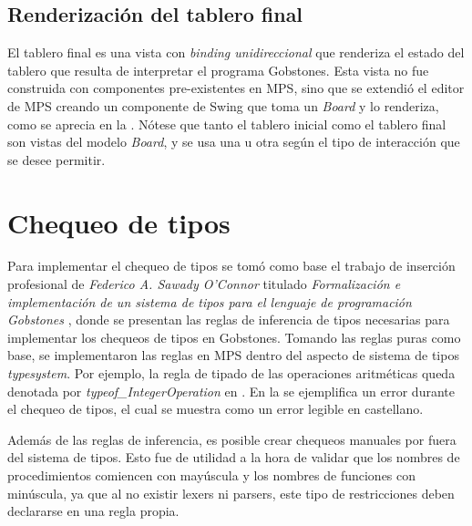 \subsection{Renderización del tablero final}

El tablero final es una vista con \textit{binding unidireccional} que renderiza el estado del tablero que resulta de interpretar el programa Gobstones. Esta vista no fue construida con componentes pre-existentes en MPS, sino que se extendió el editor de MPS creando un componente de Swing que toma un \textit{Board} y lo renderiza, como se aprecia en la . Nótese que tanto el tablero inicial como el tablero final son vistas del modelo \textit{Board}, y se usa una u otra según el tipo de interacción que se desee permitir.



\section{Chequeo de tipos}\label{chequeo}

Para implementar el chequeo de tipos se tomó como base el trabajo de inserción profesional de \textit{Federico A. Sawady O’Connor} titulado \textit{Formalización e implementación de un sistema de tipos para el lenguaje de programación Gobstones} \cite{TiposGobstones}, donde se presentan las reglas de inferencia de tipos necesarias para implementar los chequeos de tipos en Gobstones. 
Tomando las reglas puras como base, se implementaron las reglas en MPS dentro del aspecto de sistema de tipos \textit{typesystem}. Por ejemplo, la regla de tipado de las operaciones aritméticas queda denotada por \textit{typeof\_IntegerOperation} en .
En la  se ejemplifica un error durante el chequeo de tipos, el cual se muestra como un error legible en castellano.


Además de las reglas de inferencia, es posible crear chequeos manuales por fuera del sistema de tipos. Esto fue de utilidad a la hora de validar que los nombres de procedimientos comiencen con mayúscula y los nombres de funciones con minúscula, ya que al no existir lexers ni parsers, este tipo de restricciones deben declararse en una regla propia.

